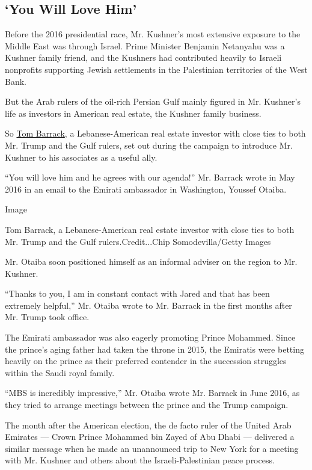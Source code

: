 \hypertarget{you-will-love-him}{%
\subsection{`You Will Love Him'}\label{you-will-love-him}}

Before the 2016 presidential race, Mr. Kushner's most extensive exposure
to the Middle East was through Israel. Prime Minister Benjamin Netanyahu
was a Kushner family friend, and the Kushners had contributed heavily to
Israeli nonprofits supporting Jewish settlements in the Palestinian
territories of the West Bank.

But the Arab rulers of the oil-rich Persian Gulf mainly figured in Mr.
Kushner's life as investors in American real estate, the Kushner family
business.

So
\href{https://www.nytimes.com/2018/06/13/world/middleeast/trump-tom-barrack-saudi.html}{Tom
Barrack}, a Lebanese-American real estate investor with close ties to
both Mr. Trump and the Gulf rulers, set out during the campaign to
introduce Mr. Kushner to his associates as a useful ally.

``You will love him and he agrees with our agenda!'' Mr. Barrack wrote
in May 2016 in an email to the Emirati ambassador in Washington, Youssef
Otaiba.

Image

Tom Barrack, a Lebanese-American real estate investor with close ties to
both Mr. Trump and the Gulf rulers.Credit...Chip Somodevilla/Getty
Images

Mr. Otaiba soon positioned himself as an informal adviser on the region
to Mr. Kushner.

``Thanks to you, I am in constant contact with Jared and that has been
extremely helpful,'' Mr. Otaiba wrote to Mr. Barrack in the first months
after Mr. Trump took office.

The Emirati ambassador was also eagerly promoting Prince Mohammed. Since
the prince's aging father had taken the throne in 2015, the Emiratis
were betting heavily on the prince as their preferred contender in the
succession struggles within the Saudi royal family.

``MBS is incredibly impressive,'' Mr. Otaiba wrote Mr. Barrack in June
2016, as they tried to arrange meetings between the prince and the Trump
campaign.

The month after the American election, the de facto ruler of the United
Arab Emirates --- Crown Prince Mohammed bin Zayed of Abu Dhabi ---
delivered a similar message when he made an unannounced trip to New York
for a meeting with Mr. Kushner and others about the Israeli-Palestinian
peace process.

